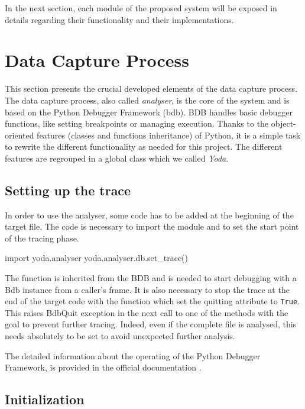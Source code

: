 In the next section, each module of the proposed system will be exposed in details regarding their functionality and their implementations.

\section{Data Capture Process}
This section presents the crucial developed elements of the data capture process. The data capture process, also called \textit{analyser}, is the core of the system and is based on the Python Debugger Framework (\gls{bdb}). BDB handles basic debugger functions, like setting breakpoints or managing execution. Thanks to the object-oriented features (classes and functions inheritance) of Python, it is a simple task to rewrite the different functionality as needed for this project. The different features are regrouped in a global class which we called \textit{Yoda}.


\subsection{Setting up the trace}
In order to use the analyser, some code has to be added at the beginning of the target file. The code is necessary to import the module and to set the start point of the tracing phase. 
\begin{python}
import yoda.analyser
yoda.analyser.db.set_trace()
\end{python}

The  function is inherited from the BDB and is needed to start debugging with a Bdb instance from a caller’s frame.
It is also necessary to stop the trace at the end of the target code with the  function which set the quitting attribute to \texttt{True}. This raises BdbQuit exception in the next call to one of the  methods with the goal to prevent further tracing. Indeed, even if the complete file is analysed, this needs absolutely to be set to avoid unexpected further analysis. 

The detailed information about the operating of the Python Debugger Framework, is provided in the official documentation \citep{Foundation2017}.

\subsection{Initialization}

